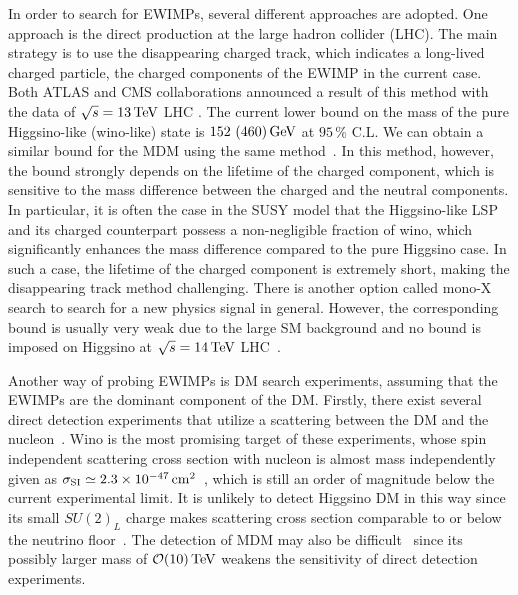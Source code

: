 \documentclass[12pt,twoside,book]{article}
\begin{document}
In order to search for EWIMPs, several different approaches are adopted.  One approach is the direct production at the large hadron collider (LHC).
The main strategy is to use the disappearing charged track, which indicates a long-lived charged particle, the charged components of the EWIMP in the current case.
Both ATLAS and CMS collaborations announced a result of this method with the data of $\sqrt{s} = 13\,{\rm TeV}$ LHC \cite{Aaboud:2017mpt, ATL-PHYS-PUB-2017-019, Sirunyan:2018ldc}.
The current lower bound on the mass of the pure Higgsino-like (wino-like) state is $152~(460)\,{\rm GeV}$ at $95\,\%$ C.L.
We can obtain a similar bound for the MDM using the same method~\cite{Ostdiek:2015aga}.
In this method, however, the bound strongly depends on the lifetime of the charged component, which is sensitive to the mass difference between the charged and the neutral components.
In particular, it is often the case in the SUSY model that the Higgsino-like LSP and its charged counterpart possess a non-negligible fraction of wino, which significantly enhances the mass difference compared to the pure Higgsino case.
In such a case, the lifetime of the charged component is extremely short, making the disappearing track method challenging.
There is another option called mono-X search to search for a new physics signal in general.
However, the corresponding bound is usually very weak due to the large SM background and no bound is imposed on Higgsino at $\sqrt{s} = 14\,{\rm TeV}$ LHC~\cite{Baer:2014cua}.

Another way of probing EWIMPs is DM search experiments, assuming that the EWIMPs are the dominant component of the DM.
Firstly, there exist several direct detection experiments that utilize a scattering between the DM and the nucleon~\cite{Akerib:2016vxi, Cui:2017nnn, Aprile:2018dbl}.
Wino is the most promising target of these experiments, whose spin independent scattering cross section with nucleon is almost mass independently given as $\sigma_{\rm SI} \simeq 2.3 \times 10^{-47}\,{\rm cm}^2$~\cite{Hisano:2010fy, Hisano:2012wm, Hisano:2015rsa, Hill:2011be, Hill:2013hoa}, which is still an order of magnitude below the current experimental limit.
It is unlikely to detect Higgsino DM in this way since its small $SU(2)_L$ charge makes scattering cross section comparable to or below the neutrino floor~\cite{Hisano:2012wm}.
The detection of MDM may also be difficult~\cite{Hisano:2011cs} since its possibly larger mass of $\mathcal{O} (10)\,{\rm TeV}$ weakens the sensitivity of direct detection experiments.
\end{document}
